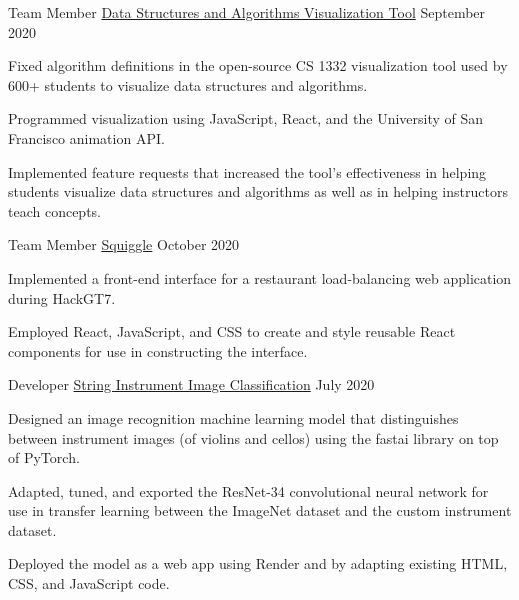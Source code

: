 \begin{cventries}

\cvproject
{Team Member} %
{
    \href{https://github.com/RodrigoDLPontes/visualization-tool}
    {Data Structures and Algorithms Visualization Tool}
} %
{} %
{September 2020} %
{ %
\begin{cvitems}
\item Fixed algorithm definitions in the open-source CS 1332 visualization tool
used by 600+ students to visualize data structures and algorithms.
\item Programmed visualization using JavaScript, React,
and the University of San Francisco animation API.
\item Implemented feature requests that increased the tool's effectiveness
in helping students visualize data structures and algorithms
as well as in helping instructors teach concepts.
\end{cvitems}
}

\cvproject
{Team Member} %
{
    \href{https://github.com/BadGuy-1863/HackGT7}
    {Squiggle}
} %
{} %
{October 2020} %
{ %
\begin{cvitems}
    \item Implemented a front-end interface for a restaurant load-balancing web application
    during HackGT7.
    \item Employed React, JavaScript, and CSS to 
    create and style reusable React components for use in constructing the interface.
\end{cvitems}
}

\cvproject
{Developer} %
{
    \href{https://github.com/hzhu359/fastai-v3}
    {String Instrument Image Classification}
} %
{} %
{July 2020} %
{ %
\begin{cvitems}
\item Designed an image recognition machine learning model
that distinguishes between instrument images (of violins and cellos)
using the fastai library on top of PyTorch.
\item Adapted, tuned, and exported the ResNet-34 convolutional neural network for use in transfer learning between the ImageNet dataset and the custom instrument dataset.
\item Deployed the model as a web app using Render and by adapting existing HTML, CSS, and JavaScript code.
\end{cvitems}
}



\end{cventries}

